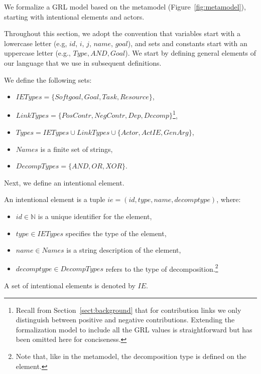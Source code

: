 We formalize a GRL model based on the metamodel (Figure~\ref{fig:metamodel}), starting with intentional elements and actors.

Throughout this section, we adopt the convention that variables start with a lowercase letter (e.g, $id$, $i$, $j$, $name$, $goal$), and sets and constants start with an uppercase letter (e.g., $Type, AND, Goal$). We start by defining general elements of our language that we use in subsequent definitions.

\begin{definition}
\label{def:set-definitions}
We define the following sets:
\begin{itemize}
\item $IETypes = \{Softgoal, Goal, Task, Resource\}$,
\item $LinkTypes = \{PosContr, NegContr, Dep, Decomp\}$\footnote{Recall from Section~\ref{sect:background} that for contribution links we only distinguish between positive and negative contributions. Extending the formalization model to include all the GRL values is straightforward but has been omitted here for conciseness.},
\item $Types = IETypes \cup LinkTypes\cup\{Actor, ActIE, GenArg\}$,
\item $Names$ is a finite set of strings,
\item $DecompTypes = \{AND,OR,XOR\}$.
\end{itemize}
\end{definition}
Next, we define an intentional element.

\begin{definition}
\label{def:ie}
An intentional element is a tuple $ie = (id, type, name, decomptype)$, where:
\begin{itemize}
\item $id\in \mathbb{N}$ is a unique identifier for the element,
\item $type\in IETypes$ specifies the type of the element,
\item $name \in Names$ is a string description of the element,
\item $decomptype\in DecompTypes$ refers to the type of decomposition.\footnote{Note that, like in the metamodel, the decomposition type is defined on the element.}
\end{itemize}
A set of intentional elements is denoted by $IE$.
\end{definition}

